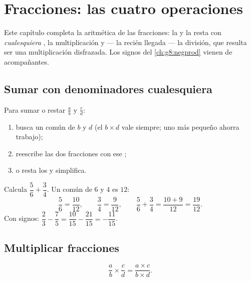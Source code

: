 \chapter{Fracciones: las cuatro operaciones}\label{ch:g8:fractions}

Este capítulo completa la aritmética de las fracciones: la  y la
resta con \emph{cualesquiera} , la multiplicación y ---
la recién llegada --- la división, que resulta ser una multiplicación
disfrazada. Los signos del \cref{ch:g8:negprod} vienen de acompañantes.

\section{Sumar con denominadores cualesquiera}

\begin{method}\label{met:g8:fractions:add}
Para sumar o restar $\frac ab$ y $\frac cd$:
\begin{enumerate}
  \item busca un  común de $b$ y $d$ (el 
        $b \times d$ vale siempre; uno más pequeño ahorra trabajo);
  \item reescribe las dos fracciones con ese ;
  \item {} o resta los  y simplifica.
\end{enumerate}
\end{method}

\begin{example}\label{ex:g8:fractions:add}
Calcula $\dfrac{5}{6} + \dfrac{3}{4}$. Un  común de $6$ y
$4$ es $12$:
\[
\frac{5}{6} = \frac{10}{12},
\qquad
\frac{3}{4} = \frac{9}{12},
\qquad
\frac{5}{6} + \frac{3}{4} = \frac{10 + 9}{12} = \frac{19}{12}.
\]
Con signos: $\dfrac{2}{3} - \dfrac{7}{5} = \dfrac{10}{15} -
\dfrac{21}{15} = -\dfrac{11}{15}$.
\end{example}

\section{Multiplicar fracciones}

\begin{theorem}\label{thm:g8:fractions:mult}
\[
\frac{a}{b} \times \frac{c}{d} = \frac{a \times c}{b \times d} .
\]
\end{theorem}

